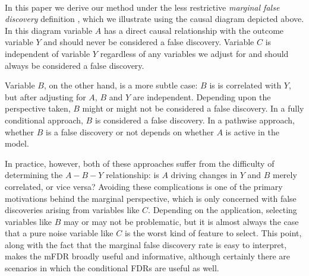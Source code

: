 \begin{center}
 \\
\end{center}

In this paper we derive our method under the less restrictive \textit{marginal false discovery} definition \citep{BrehenyMFDR}, which we illustrate using the causal diagram depicted above. In this diagram variable $A$ has a direct causal relationship with the outcome variable $Y$ and should never be considered a false discovery. Variable $C$ is independent of variable $Y$ regardless of any variables we adjust for and should always be considered a false discovery. 

Variable $B$, on the other hand, is a more subtle case: $B$ is is correlated with $Y$, but after adjusting for $A$, $B$ and $Y$ are independent. Depending upon the perspective taken, $B$ might or might not be considered a false discovery. In a fully conditional approach, $B$ is considered a false discovery.  In a pathwise approach, whether $B$ is a false discovery or not depends on whether $A$ is active in the model.

In practice, however, both of these approaches suffer from the difficulty of determining the $A-B-Y$ relationship: is $A$ driving changes in $Y$ and $B$ merely correlated, or vice versa?  Avoiding these complications is one of the primary motivations behind the marginal perspective, which is only concerned with false discoveries arising from variables like $C$.  Depending on the application, selecting variables like $B$ may or may not be problematic, but it is almost always the case that a pure noise variable like $C$ is the worst kind of feature to select.  This point, along with the fact that the marginal false discovery rate is easy to interpret, makes the mFDR broadly useful and informative, although certainly there are scenarios in which the conditional FDRs are useful as well.

